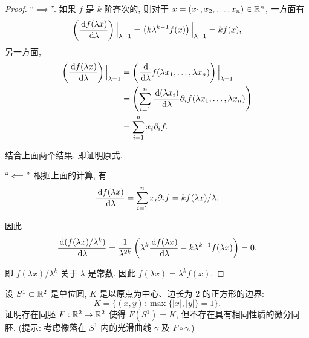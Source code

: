 \documentclass{article}
\begin{document}
\begin{proof}
	``$\implies$''. 如果 $f$ 是 $k$ 阶齐次的, 则对于 $x = (x_1,x_2,\dots,x_n) \in \mathbb{R}^n$, 一方面有 
	\[ \left( \frac{\,\mathrm{d} f(\lambda x)}{\,\mathrm{d} \lambda} \right) \Big|_{\lambda = 1} = \left( k \lambda^{k-1} f(x) \right) \Big|_{\lambda = 1} = kf(x), \]
	另一方面,
	\begin{align*}
		\left( \frac{\,\mathrm{d} f(\lambda x)}{\,\mathrm{d} \lambda} \right) \Big|_{\lambda = 1}
		&= \left( \frac{\,\mathrm{d}}{\,\mathrm{d} \lambda}f(\lambda x_1,\dots,\lambda x_n) \right) \Big|_{\lambda = 1} \\
		&= \left( \sum_{i=1}^{n} \frac{\,\mathrm{d}(\lambda x_i)}{\,\mathrm{d} \lambda} \partial_i f(\lambda x_1,\dots,\lambda x_n) \right) \\
		&= \sum_{i=1}^{n}x_i\partial_i f.
	\end{align*}
	
	结合上面两个结果, 即证明原式.

	``$\impliedby$''. 根据上面的计算, 有
	\[ \frac{\,\mathrm{d} f(\lambda x)}{\,\mathrm{d} \lambda}
	= \sum_{i=1}^{n}x_i \partial_i f
	= kf(\lambda x)/\lambda. \]

	因此
	\[ \frac{\,\mathrm{d} (f(\lambda x)/\lambda^k)}{\,\mathrm{d} \lambda}
	= \frac{1}{\lambda^{2k}} \left( \lambda^k \frac{\,\mathrm{d} f(\lambda x)}{\,\mathrm{d} \lambda} - k \lambda^{k-1} f(\lambda x) \right)=0. \]

	即 $f(\lambda x)/\lambda^k$ 关于 $\lambda$ 是常数. 因此 $f(\lambda x) = \lambda^k f(x)$.
\end{proof}



\begin{problem}
  设 $S^1\subset\mathbb{R}^2$ 是单位圆, $K$ 是以原点为中心、边长为 $2$ 的正方形的边界:
  \[
    K=\{(x,y):\max\{|x|,|y|\}=1\}.
  \]
  证明存在同胚 $F:\mathbb{R}^2\to\mathbb{R}^2$ 使得 $F(S^1)=K$, 但不存在具有相同性质的微分同胚. (提示: 考虑像落在 $S^1$ 内的光滑曲线 $\gamma$ 及 $F\circ\gamma$.)
\end{problem}
\end{document}
